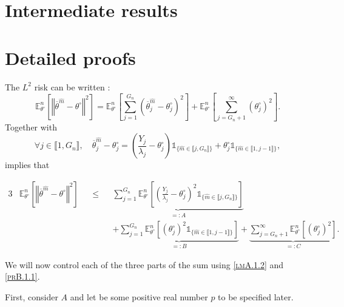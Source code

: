 \section{Intermediate results}

\section{Detailed proofs}

The $L^{2}$ risk can be written :
\[\mathds{E}_{\theta^{\circ}}^{n}\left[\left\Vert \overline{\theta}^{\widehat{m}} - \theta^{\circ} \right\Vert^{2}\right] = \mathds{E}_{\theta^{\circ}}^{n}\left[\sum\limits_{j = 1}^{G_{n}} \left( \overline{\theta}^{\widehat{m}}_{j} - \theta^{\circ}_{j} \right)^{2}\right] + \mathds{E}_{\theta^{\circ}}^{n}\left[\sum\limits_{j = G_{n} + 1}^{\infty} \left(\theta^{\circ}_{j}\right)^{2}\right].\]
Together with
\[\forall j \in \llbracket 1, G_{n} \rrbracket, \quad \overline{\theta}^{\widehat{m}}_{j} - \theta^{\circ}_{j} = \left(\frac{Y_{j}}{\lambda_{j}} - \theta^{\circ}_{j}\right) \mathds{1}_{\{\widehat{m} \in \llbracket j, G_{n} \rrbracket\}} + \theta^{\circ}_{j} \mathds{1}_{\{\widehat{m} \in \llbracket 1, j-1 \rrbracket\}},\]
implies that

\begin{alignat*}{3}
& \mathds{E}_{\theta^{\circ}}^{n}\left[\left\Vert \overline{\theta}^{\widehat{m}} - \theta^{\circ} \right\Vert^{2}\right] &&\leq&& \underbrace{\sum\limits_{j = 1}^{G_{n}}\mathds{E}_{\theta^{\circ}}^{n}\left[\left(\frac{Y_{j}}{\lambda_{j}} - \theta^{\circ}_{j}\right)^{2} \mathds{1}_{\{\widehat{m} \in \llbracket j, G_{n} \rrbracket\}}\right]}_{=: A}\\
& && && + \underbrace{\sum\limits_{j = 1}^{G_{n}}\mathds{E}_{\theta^{\circ}}^{n}\left[\left(\theta^{\circ}_{j}\right)^{2} \mathds{1}_{\{\widehat{m} \in \llbracket 1, j-1 \rrbracket\}}\right]}_{=: B}+ \underbrace{\sum\limits_{j = G_{n} + 1}^{\infty}\mathds{E}_{\theta^{\circ}}^{n}\left[\left( \theta^{\circ}_{j}\right)^{2}\right]}_{=: C}.
\end{alignat*}

\bigskip

We will now control each of the three parts of the sum using \textsc{\cref{lmA.1.2}} and \textsc{\cref{prB.1.1}}.

\bigskip

First, consider $A$ and let be some positive real number $p$ to be specified later.

